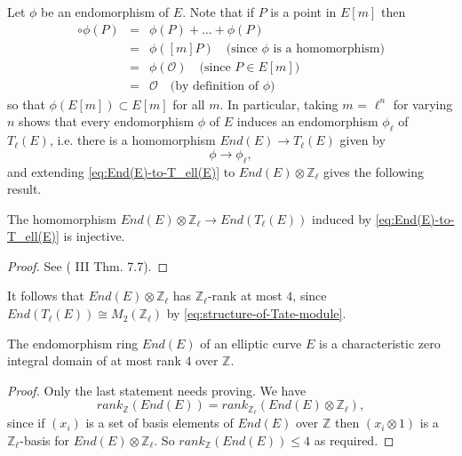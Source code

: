 Let $\phi$ be an endomorphism of $E$.  Note that if $P$ is a point in $E[m]$ then
\begin{eqnarray*}
  [m] \circ \phi (P)&=&\phi (P) + \ldots + \phi (P)\\
  &=&\phi ([m] P) \quad \text{(since $\phi$ is a homomorphism)}\\
  &=&\phi (\mathcal{O}) \quad \text{(since $P \in E[m]$)}\\
  &=&\mathcal{O} \quad \text{(by definition of $\phi$)}
\end{eqnarray*}
so that $\phi (E[m]) \subset E[m]$ for all $m$.  In particular, taking $m$ =
$\ell^{n}$ for varying $n$ shows that every endomorphism $\phi$ of $E$ induces an
endomorphism $\phi_{\ell}$ of $T_{\ell}(E)$, i.e. there is a homomorphism $End(E)
\rightarrow T_{\ell}(E)$ given by
\begin{equation}
  \label{eq:End(E)-to-T_ell(E)}
  \phi \rightarrow \phi_{\ell},
\end{equation}
and extending \eqref{eq:End(E)-to-T_ell(E)} to $End(E) \otimes \mathbb{Z}_{\ell}$ gives the following
result.

\begin{lem}
  \label{lem:End(E)-tensor-Z_ell-injects}
  The homomorphism $End(E) \otimes \mathbb{Z}_{\ell} \rightarrow End(T_{\ell}(E))$
  induced by \eqref{eq:End(E)-to-T_ell(E)} is injective.
\end{lem}
\begin{proof}
  See (\cite{silverman86} III Thm. 7.7).
\end{proof}

It follows that $End(E) \otimes \mathbb{Z}_{\ell}$ has $\mathbb{Z}_{\ell}$-rank at
most $4$, since $End(T_{\ell}(E)) \cong M_{2}(\mathbb{Z}_{\ell})$ by
\eqref{eq:structure-of-Tate-module}.

\begin{prop}
  \label{prop:rank-of-End(E)}
  The endomorphism ring $End(E)$ of an elliptic curve $E$ is a characteristic zero
  integral domain of at most rank $4$ over $\mathbb{Z}$.
\end{prop}
\begin{proof}
  Only the last statement needs proving.  We have
  \begin{equation*}
    rank_{\mathbb{Z}}(End(E)) = rank_{\mathbb{Z}_{\ell}}(End(E) \otimes \mathbb{Z}_{\ell}),
  \end{equation*}
  since if $(x_{i})$ is a set of basis elements of $End(E)$ over $\mathbb{Z}$ then
  $(x_{i} \otimes 1)$ is a $\mathbb{Z}_{\ell}$-basis for $End(E) \otimes
  \mathbb{Z}_{\ell}$.  So $rank_{\mathbb{Z}}(End(E)) \leq 4$ as required.
\end{proof}

